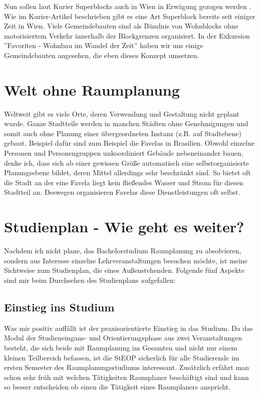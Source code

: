 \documentclass[]{article}
\begin{document}
Nun sollen laut Kurier Superblocks auch in Wien in Erwägung gezogen werden \cite{superblocks_wien}. Wie im Kurier-Artikel beschrieben gibt es eine Art Superblock bereits seit einiger Zeit in Wien. Viele Gemeindebauten sind als Bündnis von Wohnblocks ohne motorisiertem Verkehr innerhalb der Blockgrenzen organisiert. In der Exkursion ''Favoriten - Wohnbau im Wandel der Zeit'' haben wir uns einige Gemeindebauten angesehen, die eben dieses Konzept umsetzen.

\section{Welt ohne Raumplanung}
Weltweit gibt es viele Orte, deren Verwendung und Gestaltung nicht geplant wurde. Ganze Stadtteile werden in manchen Städten ohne Genehmigungen und somit auch ohne Planung einer übergeordneten Instanz (z.B. auf Stadtebene) gebaut. Beispiel dafür sind zum Beispiel die Favelas in Brasilien. Obwohl einzelne Personen und Personengruppen unkoordiniert Gebäude nebeneinander bauen, denke ich, dass sich ab einer gewissen Größe automatisch eine selbstorganisierte Planungsebene bildet, deren Mittel allerdings sehr beschränkt sind. So bietet oft die Stadt an der eine Favela liegt kein fließendes Wasser und Strom für diesen Stadtteil an. Deswegen organisieren Favelas diese Dienstleistungen oft selbst.

\section{Studienplan - Wie geht es weiter?}
Nachdem ich nicht plane, das Bachelorstudium Raumplanung zu absolvieren, sondern aus Interesse einzelne Lehrveranstaltungen besuchen möchte, ist meine Sichtweise zum Studienplan, die eines Außenstehenden. Folgende fünf Aspekte sind mir beim Durchsehen des Studienplans aufgefallen:

\subsection{Einstieg ins Studium}
Was mir positiv auffällt ist der praxisorientierte Einstieg in das Studium. Da das Modul der Studieneingans- und Orientierungsphase aus zwei Veranstaltungen besteht, die sich beide mit Raumplanung im Gesamten und nicht nur einem kleinen Teilbereich befassen, ist die StEOP sicherlich für alle Studierende im ersten Semester des Raumplanungsstudiums interessant. Zusätzlich erfährt man schon sehr früh mit welchen Tätigkeiten Raumplaner beschäftigt sind und kann so besser entscheiden ob einen die Tätigkeit eines Raumplaners anspricht.
\end{document}
